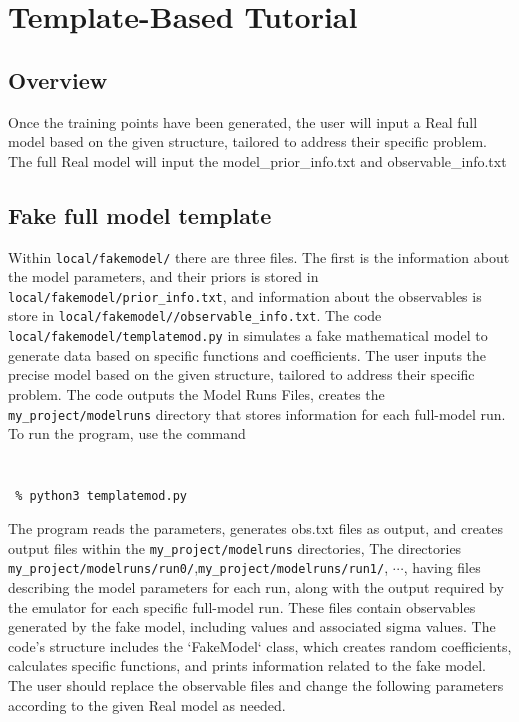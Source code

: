 \documentclass[main.tex]{subfiles}
\begin{document}
\setcounter{section}{6}
\section{Template-Based Tutorial}\label{sec:tutorial}

\subsection{Overview}
Once the training points have been generated, the user will input a Real full model based on the given structure, tailored to address their specific problem. The full Real model will input the model\_prior\_info.txt and observable\_info.txt

\subsection{Fake full model template}

Within {\tt local/fakemodel/} there are three files. The first is the information about the model parameters, and their priors is stored in {\tt local/fakemodel/prior\_info.txt}, and information about the observables is store in {\tt local/fakemodel//observable\_info.txt}. The code
{\tt local/fakemodel/templatemod.py} in simulates a fake mathematical model to generate data based on specific functions and coefficients. The user inputs the precise model based on the given structure, tailored to address their specific problem. The code outputs the Model Runs Files, creates the {\tt my\_project/modelruns} directory that stores information for each full-model run.
To run the program, use the command

\vspace{-20pt}
{\tt
\begin{verbatim} % python3 templatemod.py
\end{verbatim}
}

The program reads the parameters, generates obs.txt files as output, and creates output files within the {\tt my\_project/modelruns} directories, The directories
{\tt  my\_project/modelruns/run0/},{\tt  my\_project/modelruns/run1/}, $\cdots$, having files describing the model parameters for each run, along with the output required by the emulator for each specific full-model run. These files contain observables generated by the fake model, including values and associated sigma values. The code's structure includes the `FakeModel` class, which creates random coefficients, calculates specific functions, and prints information related to the fake model. The user should replace the observable files and change the following parameters according to the given Real model as needed.
\end{document}
